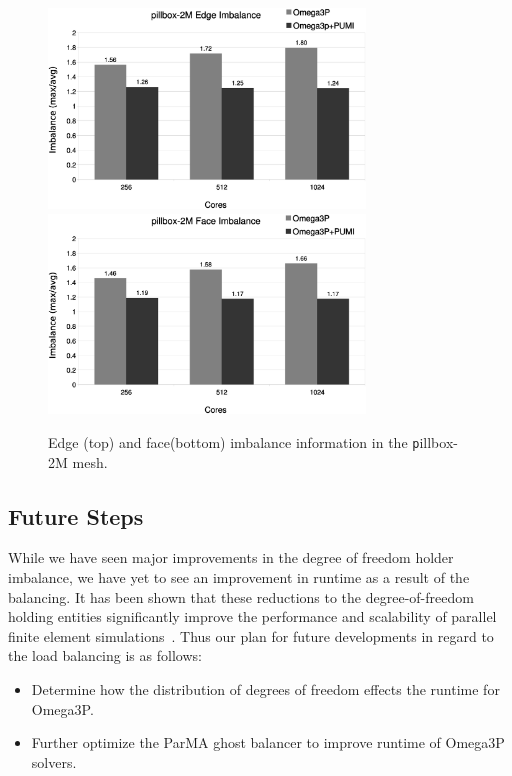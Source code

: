 \documentclass[review,12pt]{elsarticle_summary_report}
\begin{document}
\begin{figure}[!ph]
\centering
  \includegraphics[width=0.75\textwidth]{pillbox2M-edge-imb.eps} \\
  \includegraphics[width=0.75\textwidth]{pillbox2M-face-imb.eps}
  \caption{\label{fig:pillboximb} Edge (top) and face(bottom) imbalance information  in the {\texttt
  pillbox-2M}
  mesh.}
\end{figure}

\subsection{\label{load_balance_future} Future Steps}
While we have seen major improvements in the degree of freedom holder imbalance,
we have yet to see an improvement in runtime as a result of the balancing. It has been shown that 
these reductions to the degree-of-freedom holding entities significantly improve the 
performance and scalability of
parallel finite element simulations~\cite{zhou2012unstructured}.
 Thus our plan for future developments in regard to the load balancing  is as follows:

\begin{itemize}
  \item Determine how the distribution of degrees of freedom effects the runtime for Omega3P.
  \item Further optimize the ParMA ghost balancer to improve runtime of Omega3P solvers.
\end{itemize}
\end{document}
